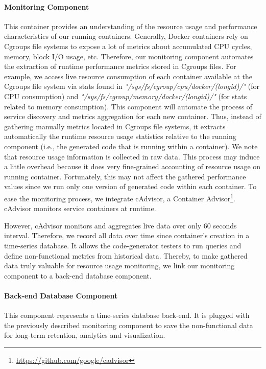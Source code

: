 \paragraph{Monitoring Component}
This container provides an understanding of the resource usage and performance characteristics of our running containers. Generally, Docker containers rely on Cgroups file systems to expose a lot of metrics about accumulated CPU cycles, memory, block I/O usage, etc. Therefore, our monitoring component automates the extraction of runtime performance metrics stored in Cgroups files. For example, we access live resource consumption of each container available at the Cgroups file system via stats found in \textit{"/sys/fs/cgroup/cpu/docker/(longid)/"} (for CPU consumption) and \textit{"/sys/fs/cgroup/memory/docker/(longid)/"} (for stats related to memory consumption). This component will automate the process of service discovery and metrics aggregation for each new container. Thus, instead of gathering manually metrics located in Cgroups file systems, it extracts automatically the runtime resource usage statistics relative to the running component (i.e., the generated code that is running within a container). We note that resource usage information is collected in raw data. This process may induce a little overhead because it does very fine-grained accounting of resource usage on running container. Fortunately, this may not affect the gathered performance values since we run only one version of generated code within each container.
To ease the monitoring process, we integrate cAdvisor, a Container Advisor\footnote{\url{https://github.com/google/cadvisor}}. cAdvisor monitors service containers at runtime. 

However, cAdvisor monitors and aggregates live data over only 60 seconds interval. Therefore, we record all data over time since container's creation in a time-series database. It allows the code-generator testers to run queries and define non-functional metrics from historical data. Thereby, to make gathered data truly valuable for resource usage monitoring, we link our monitoring component to a back-end database component. 



\paragraph{Back-end Database Component}
This component represents a time-series database back-end. It is plugged with the previously described monitoring component to save the non-functional data for long-term retention, analytics and visualization. 


